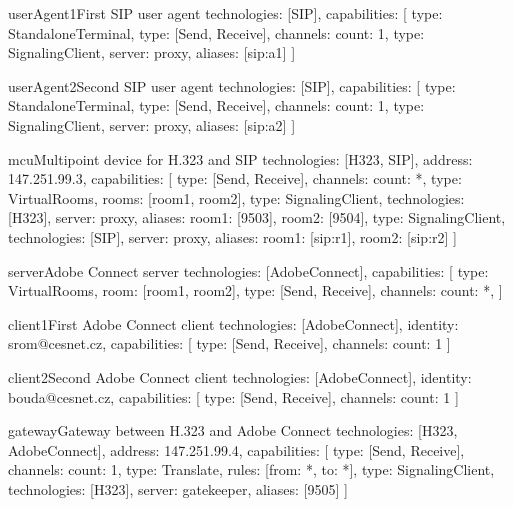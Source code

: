 \begin{TopologyExample}{userAgent1}{First SIP user agent}
technologies: [SIP],
capabilities: [
  {type: StandaloneTerminal}, {type: [Send, Receive], channels: {count: 1}}, 
  {type: SignalingClient, server: proxy, aliases: [sip:a1]}
]
\end{TopologyExample}

\begin{TopologyExample}{userAgent2}{Second SIP user agent}
technologies: [SIP],
capabilities: [
  {type: StandaloneTerminal}, {type: [Send, Receive], channels: {count: 1}}, 
  {type: SignalingClient, server: proxy, aliases: [sip:a2]}
]
\end{TopologyExample}

\begin{TopologyExample}{mcu}{Multipoint device for H.323 and SIP}
technologies: [H323, SIP], address: 147.251.99.3,
capabilities: [
  {type: [Send, Receive], channels: {count: *}}, 
  {type: VirtualRooms, rooms: [room1, room2]},
  {type: SignalingClient, technologies: [H323], server: proxy, 
     aliases: {room1: [9503], room2: [9504]}},
  {type: SignalingClient, technologies: [SIP], server: proxy, 
     aliases: {room1: [sip:r1], room2: [sip:r2]}}
]
\end{TopologyExample}

\begin{TopologyExample}{server}{Adobe Connect server}
technologies: [AdobeConnect],
capabilities: [
  {type: VirtualRooms, room: [room1, room2]}, 
  {type: [Send, Receive], channels: {count: *}}, 
]
\end{TopologyExample}

\begin{TopologyExample}{client1}{First Adobe Connect client}
technologies: [AdobeConnect], identity: srom@cesnet.cz,
capabilities: [
  {type: [Send, Receive], channels: {count: 1}}
]
\end{TopologyExample}

\begin{TopologyExample}{client2}{Second Adobe Connect client}
technologies: [AdobeConnect], identity: bouda@cesnet.cz,
capabilities: [
  {type: [Send, Receive], channels: {count: 1}}
]
\end{TopologyExample}

\begin{TopologyExample}{gateway}{Gateway between H.323 and Adobe Connect}
technologies: [H323, AdobeConnect], address: 147.251.99.4,
capabilities: [
  {type: [Send, Receive], channels: {count: 1}},
  {type: Translate, rules: [{from: *, to: *}]},
  {type: SignalingClient, technologies: [H323], server: gatekeeper, 
     aliases: [9505]}
]
\end{TopologyExample}

